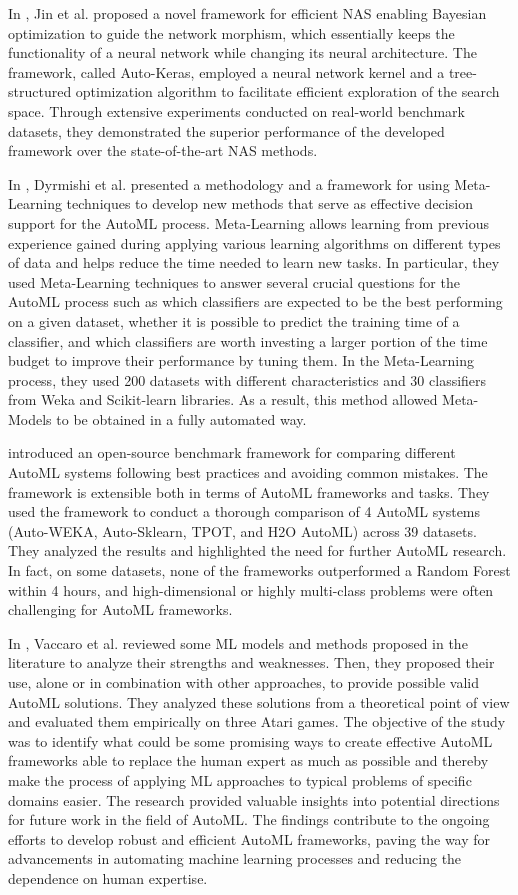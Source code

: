 In \cite{Jin2019}, Jin et al. proposed a novel framework for efficient NAS enabling Bayesian optimization to guide the network morphism, which essentially keeps the functionality of a neural network while changing its neural architecture.
The framework, called Auto-Keras, employed a neural network kernel and a tree-structured optimization algorithm to facilitate efficient exploration of the search space.
Through extensive experiments conducted on real-world benchmark datasets, they demonstrated the superior performance of the developed framework over the state-of-the-art NAS methods.

In \cite{8955514}, Dyrmishi et al. presented a methodology and a framework for using Meta-Learning techniques to develop new methods that serve as effective decision support for the AutoML process.
Meta-Learning allows learning from previous experience gained during applying various learning algorithms on different types of data and helps reduce the time needed to learn new tasks.
In particular, they used Meta-Learning techniques to answer several crucial questions for the AutoML process such as which classifiers are expected to be the best performing on a given dataset, whether it is possible to predict the training time of a classifier, and which classifiers are worth investing a larger portion of the time budget to improve their performance by tuning them.
In the Meta-Learning process, they used 200 datasets with different characteristics and 30 classifiers from Weka and Scikit-learn libraries.
As a result, this method allowed Meta-Models to be obtained in a fully automated way.

\cite{Gijsbers2019} introduced an open-source benchmark framework for comparing different AutoML systems following best practices and avoiding common mistakes.
The framework is extensible both in terms of AutoML frameworks and tasks.
They used the framework to conduct a thorough comparison of 4 AutoML systems (Auto-WEKA, Auto-Sklearn, TPOT, and H2O AutoML) across 39 datasets.
They analyzed the results and highlighted the need for further AutoML research.
In fact, on some datasets, none of the frameworks outperformed a Random Forest within 4 hours, and high-dimensional or highly multi-class problems were often challenging for AutoML frameworks.

In \cite{computers10010011}, Vaccaro et al. reviewed some ML models and methods proposed in the literature to analyze their strengths and weaknesses.
Then, they proposed their use, alone or in combination with other approaches, to provide possible valid AutoML solutions.
They analyzed these solutions from a theoretical point of view and evaluated them empirically on three Atari games.
The objective of the study was to identify what could be some promising ways to create effective AutoML frameworks able to replace the human expert as much as possible and thereby make the process of applying ML approaches to typical problems of specific domains easier.
The research provided valuable insights into potential directions for future work in the field of AutoML.
The findings contribute to the ongoing efforts to develop robust and efficient AutoML frameworks, paving the way for advancements in automating machine learning processes and reducing the dependence on human expertise.

